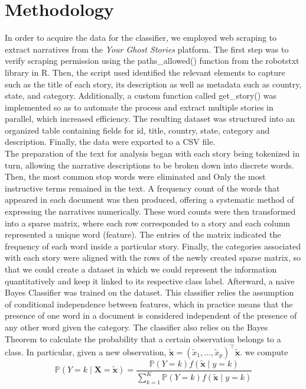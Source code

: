 \documentclass[twocolumn]{article}
\begin{document}
\section{Methodology}
In order to acquire the data for the classifier, we employed web scraping to extract narratives from the \textit{Your Ghost Stories} platform. The first step was to verify scraping permission using the paths\_allowed() function from the robotstxt library in R. Then, the script used identified the relevant elements to capture such as the title of each story, its description as well as metadata such as country, state, and category. Additionally, a custom function called get\_story() was implemented so as to automate the process and extract multiple stories in parallel, which increased efficiency. The resulting dataset was structured into an organized table containing fields for id, title, country, state, category and description. Finally, the data were exported to a CSV file. \\
The preparation of the text for analysis began with each story being tokenized in turn, allowing the narrative descriptions to be broken down into discrete words. Then, the most common stop words were eliminated and Only the most instructive terms remained in the text. A frequency count of the words that appeared in each document was then produced, offering a systematic method of  expressing the narratives numerically. These word counts were then transformed into a sparse matrix, where each row corresponded to a story and each column represented a unique word (feature). The entries of the matrix indicated the frequency of each word inside a particular story. 
Finally, the categories associated with each story were aligned with the rows of the newly created sparse matrix, so that we could create a dataset in which we could represent the information quantitatively and keep it linked to its respective class label.
Afterward, a naive Bayes Classifier was trained on the dataset. This classifier relies the assumption of conditional independence between features, which in practice means that the presence of one word in a document is considered independent of the presence of any other word given the category. The classifier also relies on the Bayes Theorem to calculate the probability that a certain observation belongs to a class.
In particular, given a new observation, 
\( \tilde{\boldsymbol{x}} = (\tilde{x}_{1}, \dots, \tilde{x}_{p})^{\intercal}\tilde{\boldsymbol{x}}.\)
we compute
\[
\mathbb{P}(Y = k \mid \boldsymbol{X} = \tilde{\boldsymbol{x}}) = \frac{\mathbb{P}(Y = k)f(\tilde{\boldsymbol{x}} \mid y = k)}{\sum_{k = 1}^{K} \mathbb{P}(Y = k)f(\tilde{\boldsymbol{x}} \mid y = k)}
\]
\end{document}
